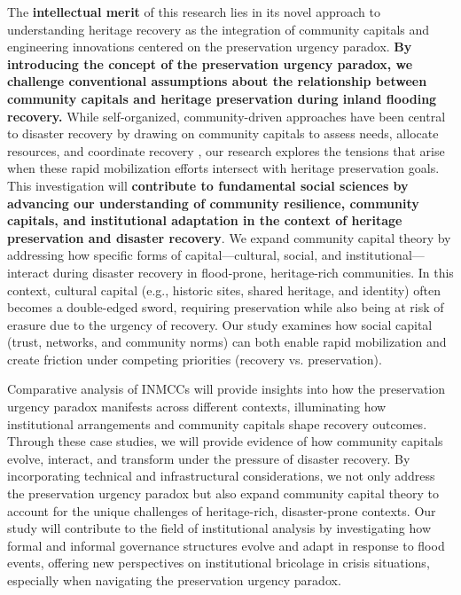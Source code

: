 \documentclass[11pt]{article}
\begin{document}
The \textbf{intellectual merit} of this research lies in its novel approach to understanding heritage recovery as the integration of community capitals and engineering innovations centered on the preservation urgency paradox. 
\textbf{By introducing the concept of the preservation urgency paradox, we challenge conventional assumptions \cite{MurzynKupisz2013, HistoricEngland2023} about the relationship between community capitals and heritage preservation during inland flooding recovery.} 
While self-organized, community-driven approaches have been central to disaster recovery by drawing on community capitals to assess needs, allocate resources, and coordinate recovery \cite{imperiale2016experiencing}, our research explores the tensions that arise when these rapid mobilization efforts intersect with heritage preservation goals. 
This investigation will \textbf{contribute to fundamental social sciences by advancing our understanding of community resilience, community capitals, and institutional adaptation in the context of heritage preservation and disaster recovery}.
We expand community capital theory by addressing how specific forms of capital—cultural, social, and institutional—interact during disaster recovery in flood-prone, heritage-rich communities. 
In this context, cultural capital (e.g., historic sites, shared heritage, and identity) often becomes a double-edged sword, requiring preservation while also being at risk of erasure due to the urgency of recovery. 
Our study examines how social capital (trust, networks, and community norms) can both enable rapid mobilization and create friction under competing priorities (recovery vs. preservation). 

Comparative analysis of INMCCs will provide insights into how the preservation urgency paradox manifests across different contexts, illuminating how institutional arrangements and community capitals shape recovery outcomes. 
Through these case studies, we will provide evidence of how community capitals evolve, interact, and transform under the pressure of disaster recovery. 
By incorporating technical and infrastructural considerations, we not only address the preservation urgency paradox but also expand community capital theory to account for the unique challenges of heritage-rich, disaster-prone contexts.
Our study will contribute to the field of institutional analysis by investigating how formal and informal governance structures evolve and adapt in response to flood events, offering new perspectives on institutional bricolage in crisis situations, especially when navigating the preservation urgency paradox.
\end{document}
